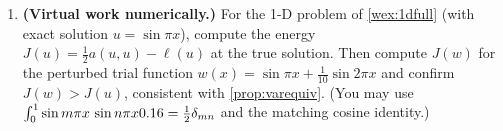 \begin{enumerate}[nosep]
  form \cref{eq:mass}. Writing both as members of the family
  \cref{eq:family}, give the pair $(Q,\diffop)$ for each. Discretized, this
  becomes $\mat{K}\vx=\lambda\mat{M}\vx$ with $\lambda=\omega^2$; which form
  produces $\mat{K}$ and which produces $\mat{M}$?
  \item \textbf{(Virtual work numerically.)} For the 1-D problem of
  \cref{wex:1dfull} (with exact solution $u=\sin\pi x$), compute the energy
  $J(u)=\tfrac12 a(u,u)-\ell(u)$ at the true solution. Then compute $J(w)$ for
  the perturbed trial function $w(x)=\sin\pi x + \tfrac1{10}\sin 2\pi x$ and
  confirm $J(w)>J(u)$, consistent with \cref{prop:varequiv}. (You may use
  $\int_0^1\sin m\pi x\,\sin n\pi x0.16=\tfrac12\delta_{mn}$ and the matching
  cosine identity.)
\end{enumerate}
